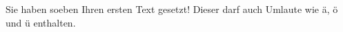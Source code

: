 \documentclass{article}
\begin{document}
Sie haben soeben Ihren ersten Text gesetzt! Dieser darf auch Umlaute wie ä, ö und ü enthalten.
\end{document}
